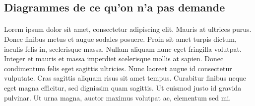 \subsection{Diagrammes de ce qu'on n'a pas demande}
\paragraph{} 
Lorem ipsum dolor sit amet, consectetur adipiscing elit. Mauris at ultrices purus. Donec finibus metus et augue sodales posuere. Proin sit amet turpis dictum, iaculis felis in, scelerisque massa. Nullam aliquam nunc eget fringilla volutpat. Integer et mauris et massa imperdiet scelerisque mollis at sapien. Donec condimentum felis eget sagittis ultricies. Nunc laoreet augue id consectetur vulputate. Cras sagittis aliquam risus sit amet tempus. Curabitur finibus neque eget magna efficitur, sed dignissim quam sagittis. Ut euismod justo id gravida pulvinar. Ut urna magna, auctor maximus volutpat ac, elementum sed mi.
